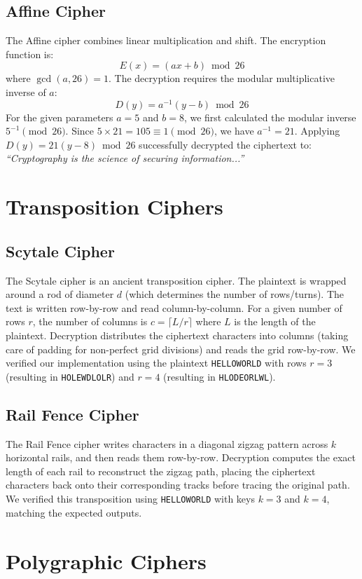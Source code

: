 \documentclass{article}
\begin{document}
\subsection{Affine Cipher}
The Affine cipher combines linear multiplication and shift. The encryption function is:
\[ E(x) = (ax + b) \bmod 26 \]
where $\gcd(a, 26) = 1$. The decryption requires the modular multiplicative inverse of $a$:
\[ D(y) = a^{-1}(y - b) \bmod 26 \]
For the given parameters $a = 5$ and $b = 8$, we first calculated the modular inverse $5^{-1} \pmod{26}$. Since $5 \times 21 = 105 \equiv 1 \pmod{26}$, we have $a^{-1} = 21$.
Applying $D(y) = 21(y - 8) \bmod 26$ successfully decrypted the ciphertext to: \textit{``Cryptography is the science of securing information...''}

\section{Transposition Ciphers}

\subsection{Scytale Cipher}
The Scytale cipher is an ancient transposition cipher. The plaintext is wrapped around a rod of diameter $d$ (which determines the number of rows/turns). The text is written row-by-row and read column-by-column. 
For a given number of rows $r$, the number of columns is $c = \lceil L / r \rceil$ where $L$ is the length of the plaintext. Decryption distributes the ciphertext characters into columns (taking care of padding for non-perfect grid divisions) and reads the grid row-by-row. We verified our implementation using the plaintext \texttt{HELLOWORLD} with rows $r = 3$ (resulting in \texttt{HOLEWDLOLR}) and $r = 4$ (resulting in \texttt{HLODEORLWL}).

\subsection{Rail Fence Cipher}
The Rail Fence cipher writes characters in a diagonal zigzag pattern across $k$ horizontal rails, and then reads them row-by-row. Decryption computes the exact length of each rail to reconstruct the zigzag path, placing the ciphertext characters back onto their corresponding tracks before tracing the original path. We verified this transposition using \texttt{HELLOWORLD} with keys $k = 3$ and $k = 4$, matching the expected outputs.

\section{Polygraphic Ciphers}
\end{document}
